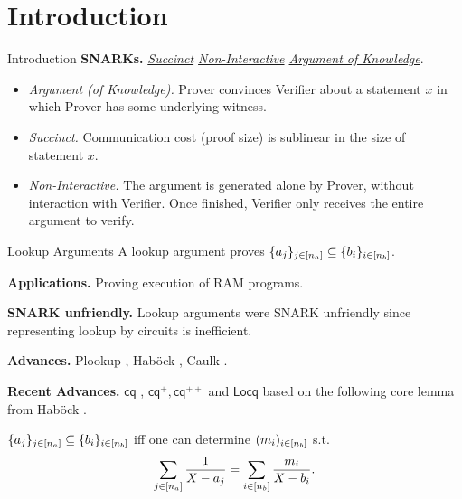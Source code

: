 \section{Introduction}
\begin{frame}{Introduction}
	\textbf{SNARKs.} \textit{\underline{Succinct} \underline{Non-Interactive} \underline{Argument of Knowledge}}.
	\begin{itemize}
		\item \textit{Argument (of Knowledge).} Prover convinces Verifier about a statement $x$ in which Prover has some underlying witness.
		\item \textit{Succinct.} Communication cost (proof size) is sublinear in the size of statement $x$.
		\item \textit{Non-Interactive.} The argument is generated alone by Prover, without interaction with Verifier. Once finished, Verifier only receives the entire argument to verify.
	\end{itemize}
\end{frame}
\begin{frame}{Lookup Arguments}
	A lookup argument \cite{AC:BCGJM18} proves $\{a_j\}_{j \in [{n_a}]} \subseteq \{b_i\}_{i \in [{n_b}]}$.
	
	\textbf{Applications.} Proving execution of RAM programs.
	
	\textbf{SNARK unfriendly.} Lookup arguments were SNARK unfriendly since representing lookup by circuits is inefficient.
	
	\textbf{Advances.} Plookup \cite{EPRINT:GabWil20}, Hab{\"o}ck \cite{EPRINT:Habock22b}, Caulk \cite{CCS:ZBKMNS22}.
	
	\textbf{Recent Advances.} $\mathsf{cq}$ \cite{EPRINT:EagFioGab22}, $\mathsf{cq}^+, \mathsf{cq}^{++}$ \cite{PKC:CFFLL24} and $\mathsf{Locq}$ \cite{PKC:ZSG24} based on the following core lemma from Hab{\"o}ck \cite{EPRINT:Habock22b}.
	\begin{lemma}
		$\{a_j\}_{j \in [{n_a}]} \subseteq \{b_i\}_{i \in [{n_b}]}$ iff one can determine $(m_i)_{i \in [{n_b}]}$ s.t.
		\begin{equation*}
			\sum_{j \in [{n_a}]}\frac{1}{X - a_j} = \sum_{i \in [{n_b}]}\frac{m_i}{X - b_i}.
		\end{equation*}
	\end{lemma}
\end{frame}

